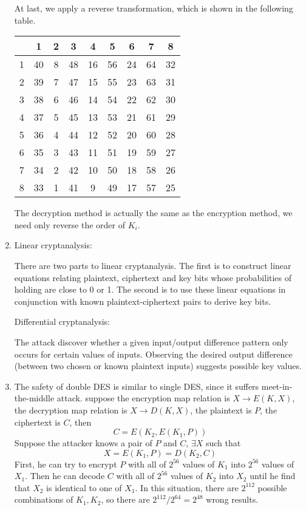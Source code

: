 \documentclass{article}
\begin{document}
\begin{enumerate}
At last, we apply a reverse transformation, which is shown in the following table.
\begin{center}
\begin{tabular}{c|cccccccc}
& 1 & 2 & 3 & 4 & 5 & 6 & 7 & 8 \\
\hline
1 & 40 & 8 & 48 & 16 & 56 & 24 & 64 & 32 \\
2 & 39 & 7 & 47 & 15 & 55 & 23 & 63 & 31 \\
3 & 38 & 6 & 46 & 14 & 54 & 22 & 62 & 30 \\
4 & 37 & 5 & 45 & 13 & 53 & 21 & 61 & 29 \\
5 & 36 & 4 & 44 & 12 & 52 & 20 & 60 & 28 \\
6 & 35 & 3 & 43 & 11 & 51 & 19 & 59 & 27 \\
7 & 34 & 2 & 42 & 10 & 50 & 18 & 58 & 26 \\
8 & 33 & 1 & 41 &  9 & 49 & 17 & 57 & 25 \\
\end{tabular}
\end{center}

The decryption method is actually the same as the encryption method, we need only reverse the order of $K_i$.

\item
Linear cryptanalysis:

There are two parts to linear cryptanalysis. The first is to construct linear equations relating plaintext, ciphertext and key bits whose probabilities of holding are close to 0 or 1. The second is to use these linear equations in conjunction with known plaintext-ciphertext pairs to derive key bits.

Differential cryptanalysis:

The attack discover whether a given input/output difference pattern only occurs for certain values of inputs. Observing the desired output difference (between two chosen or known plaintext inputs) suggests possible key values.

\item
The safety of double DES is similar to single DES, since it suffers meet-in-the-middle attack. suppose the encryption map relation is $X\rightarrow E(K,X)$, the decryption map relation is $X\rightarrow D(K,X)$, the plaintext is $P$, the ciphertext is $C$, then
$$C=E(K_2,E(K_1,P))$$
Suppose the attacker knows a pair of $P$ and $C$, $\exists X$ such that $$X=E(K_1,P)=D(K_2,C)$$
First, he can try to encrypt $P$ with all of $2^{56}$ values of $K_1$ into $2^{56}$ values of $X_1$. Then he can decode $C$ with all of $2^{56}$ values of $K_2$ into $X_2$ until he find that $X_2$ is identical to one of $X_1$. In this situation, there are $2^{112}$ possible combinations of $K_1,K_2$, so there are $2^{112}/2^{64}=2^{48}$ wrong results.


\end{enumerate}
\end{document}
